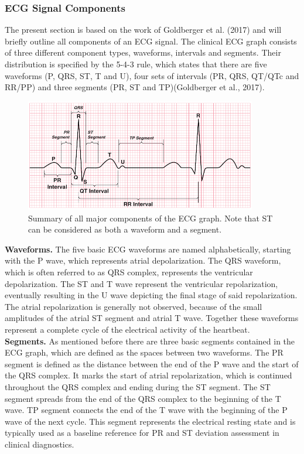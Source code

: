 \subsubsection{ECG Signal Components}
The present section is based on the work of Goldberger et al. (2017) and will briefly outline all components of an ECG signal. The clinical ECG graph consists of three different component types, waveforms, intervals and segments. Their distribution is specified by the 5-4-3 rule, which states that there are five waveforms (P, QRS, ST, T and U), four sets of intervals (PR, QRS, QT/QTc and RR/PP) and three segments (PR, ST and TP)(Goldberger et al., 2017).

\begin{figure}[ht]
\centering
\includegraphics[width=0.9\textwidth]{images/ecgcomp.png}
\caption{Summary of all major components of the ECG graph. Note that ST can be considered as both a waveform and a segment.\citep{GOLDBERGER2017}}
\label{ecgcompImg}
\end{figure}

\textbf{Waveforms.} The five basic ECG waveforms are named alphabetically, starting with the P wave, which represents atrial depolarization. The QRS waveform, which is often referred to as QRS complex, represents the ventricular depolarization. The ST and T wave represent the ventricular repolarization, eventually resulting in the U wave depicting the final stage of said repolarization. The atrial repolarization is generally not observed, because of the small amplitudes of the atrial ST segment and atrial T wave. Together these waveforms represent a complete cycle of the electrical activity of the heartbeat.\\

\textbf{Segments.} As mentioned before there are three basic segments contained in the ECG graph, which are defined as the spaces between two waveforms. The PR segment is defined as the distance between the end of the P wave and the start of the QRS complex. It marks the start of atrial repolarization, which is continued throughout the QRS complex and ending during the ST segment. The ST segment spreads from the end of the QRS complex to the beginning of the T wave. TP segment connects the end of the T wave with the beginning of the P wave of the next cycle. This segment represents the electrical resting state and is typically used as a baseline reference for PR and ST deviation assessment in clinical diagnostics.\\


